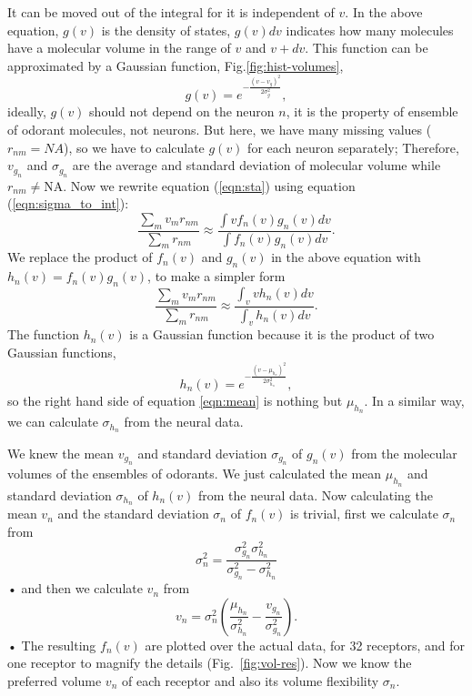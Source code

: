 \documentclass[11pt]{paper} %
\newcommand{\numberofreceptors}{32 }
\begin{document}
It can be moved out of the integral for it is independent of $v$.
In the above equation, 
$g(v)$ is the density of states, $g(v) dv$ indicates how many molecules have a molecular volume in the range of $v$ and $v+dv$.
This function can be approximated by a Gaussian function, Fig.\ref{fig:hist-volumes}, 
\begin{equation}
	g(v) = e^{-\frac{(v- v_{g})^2}{2 \sigma_{g}^2}},
	\label{eqn:hist-volumes}
\end{equation}
ideally, $g(v)$ should not depend on the neuron $n$, 
it is the property of ensemble of odorant molecules, not neurons. 
But here, we have many missing values ($r_{nm} = NA$), 
so we have to calculate $g(v)$ for each neuron separately; 
Therefore, $v_{g_n}$ and $\sigma_{g_n}$ are the average and standard deviation of molecular volume while $r_{nm} \neq \text{NA}$.
Now we rewrite equation (\ref{eqn:sta}) using equation (\ref{eqn:sigma_to_int}):
\begin{equation}
	\frac{\displaystyle \sum_{m} v_m r_{nm}}{\displaystyle \sum_{m} r_{nm}} \approx \frac{\displaystyle \int v f_n(v) g_n(v) dv}{\displaystyle \int f_n(v) g_n(v) dv}.
	\label{eqn:sta_int}
\end{equation}
We replace the product of $f_n(v)$ and $g_n(v)$ in the above equation with $h_n(v) = f_n(v) g_n(v)$, to make a simpler form
\begin{equation}
	\frac{\displaystyle \sum_{m} v_m r_{nm}}{\displaystyle \sum_{m} r_{nm}} \approx \frac{\displaystyle \int_v v h_n(v) dv}{ \displaystyle \int_v  h_n(v) dv }.
	\label{eqn:mean}
\end{equation}
The function $h_n(v)$ is a Gaussian function because it is the product of two Gaussian functions, 
\begin{equation}
h_n(v) = e^{-\frac{(v-\mu_{h_n})^2}{2\sigma_{h_n}^2}}, 
\end{equation}
so the right hand side of equation \ref{eqn:mean} is nothing but $\mu_{h_n}$. 
In a similar way, we can calculate $\sigma_{h_n}$ from the neural data.

We knew the mean $v_{g_n}$ and standard deviation $\sigma_{g_n}$ of $g_n(v)$ from the molecular volumes of the ensembles of odorants. 
We just calculated the mean $\mu_{h_n}$ and standard deviation $\sigma_{h_n}$ of $h_n(v)$ from the neural data.
Now calculating the mean $v_n$ and the standard deviation $\sigma_n$ of $f_n(v)$ is trivial,
first we calculate $\sigma_n$ from 
\begin{equation}
	\sigma_n^2 = \frac{\sigma^2_{g_n} \sigma^2_{h_n}}{\sigma^2_{g_n} - \sigma^2_{h_n}}
\end{equation}•
and then we calculate $v_n$ from 
\begin{equation}
	v_n =  \sigma_n^2 \left ( \frac{\mu_{h_n}}{\sigma^2_{h_n}} - \frac{v_{g_n}}{\sigma^2_{g_n}} \right ).
\end{equation}•
The resulting $f_n(v)$ are plotted over the actual data, for \numberofreceptors  receptors, and for one receptor to magnify the details (Fig.~\ref{fig:vol-res}).
Now we know the preferred volume $v_n$ of each receptor and also its volume flexibility $\sigma_n$.
\end{document}

